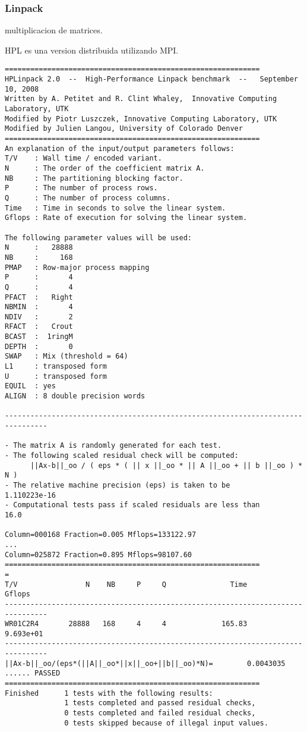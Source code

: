 \documentclass[a4paper]{report}
\begin{document}
\subsubsection{Linpack}

\cite{linpack}

multiplicacion de matrices.

\cite{hpl}

HPL es una version distribuida utilizando MPI.

\begin{verbatim}
============================================================
HPLinpack 2.0  --  High-Performance Linpack benchmark  --   September 10, 2008
Written by A. Petitet and R. Clint Whaley,  Innovative Computing Laboratory, UTK
Modified by Piotr Luszczek, Innovative Computing Laboratory, UTK
Modified by Julien Langou, University of Colorado Denver
============================================================
An explanation of the input/output parameters follows:
T/V    : Wall time / encoded variant.
N      : The order of the coefficient matrix A.
NB     : The partitioning blocking factor.
P      : The number of process rows.
Q      : The number of process columns.
Time   : Time in seconds to solve the linear system.
Gflops : Rate of execution for solving the linear system.

The following parameter values will be used:
N      :   28888
NB     :     168
PMAP   : Row-major process mapping
P      :       4
Q      :       4
PFACT  :   Right
NBMIN  :       4
NDIV   :       2
RFACT  :   Crout
BCAST  :  1ringM
DEPTH  :       0
SWAP   : Mix (threshold = 64)
L1     : transposed form
U      : transposed form
EQUIL  : yes
ALIGN  : 8 double precision words

--------------------------------------------------------------------------------

- The matrix A is randomly generated for each test.
- The following scaled residual check will be computed:
      ||Ax-b||_oo / ( eps * ( || x ||_oo * || A ||_oo + || b ||_oo ) * N )
- The relative machine precision (eps) is taken to be               1.110223e-16
- Computational tests pass if scaled residuals are less than                16.0

Column=000168 Fraction=0.005 Mflops=133122.97
...
Column=025872 Fraction=0.895 Mflops=98107.60
============================================================
=
T/V                N    NB     P     Q               Time                 Gflops
--------------------------------------------------------------------------------
WR01C2R4       28888   168     4     4             165.83              9.693e+01
--------------------------------------------------------------------------------
||Ax-b||_oo/(eps*(||A||_oo*||x||_oo+||b||_oo)*N)=        0.0043035 ...... PASSED
============================================================
Finished      1 tests with the following results:
              1 tests completed and passed residual checks,
              0 tests completed and failed residual checks,
              0 tests skipped because of illegal input values.
\end{verbatim}
\end{document}
